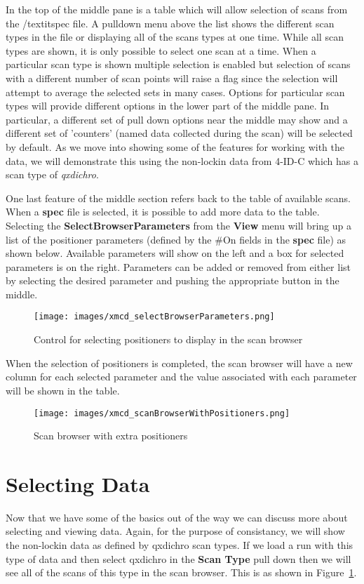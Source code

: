\documentclass[12pt,letterpaper, openany]{book}
\begin{document}
In the top of the middle pane is a table which will allow selection of scans
from the /textit{spec} file.  A pulldown menu above the list shows the different
scan types in the file or displaying all of the scans types at one time.  While
all scan types are shown, it is only possible to select one scan at a time. 
When a particular scan type is shown multiple selection is enabled but selection
of scans with a different number of scan points will raise a flag since the
selection will attempt to average the selected sets in many cases.  Options for
particular scan types will provide different options in the lower part of the
middle pane.  In particular, a different set of pull down options near the
middle may show and a different set of 'counters' (named data collected during
the scan) will be selected by default.  As we move into showing some of the
features for working with the data, we will demonstrate this using the
non-lockin data from 4-ID-C which has a scan type of \textit{qxdichro}.

One last feature of the middle section refers back to the table of available
scans.  When a \textbf{spec} file is selected, it is possible to add more data
to the table.  Selecting the \textbf{SelectBrowserParameters} from the
\textbf{View} menu will bring up a list of the positioner parameters (defined
by the \#On fields in the \textbf{spec} file)  as shown below.  Available
parameters will show on the left and a box for selected parameters is on the
right.  Parameters can be added or removed from either list by selecting the
desired parameter and pushing the appropriate button in the middle.

\begin{figure}
\texttt{[image: images/xmcd\_selectBrowserParameters.png]}
\caption {Control for selecting positioners to display in the scan browser}
\end{figure}

When the selection of positioners is completed, the scan browser will have a new
column for each selected parameter and the value associated with each parameter
will be shown in the table.

\begin{figure}
\texttt{[image: images/xmcd\_scanBrowserWithPositioners.png]}
\caption {Scan browser with extra positioners}
\label{fig:selectedScanBrowser}
\end{figure}

\section{Selecting Data}
Now that we have some of the basics out of the way we can discuss more about
selecting and viewing data.  Again, for the purpose of consistancy, we will show
the non-lockin data as defined by qxdichro scan types.  If we load a run with
this type of data and then select qxdichro in the \textbf{Scan Type} pull down
then we will see all of the scans of this type in the scan browser.  This is as
shown in Figure~\ref{fig:selectedScanBrowser}.  
\end{document}
